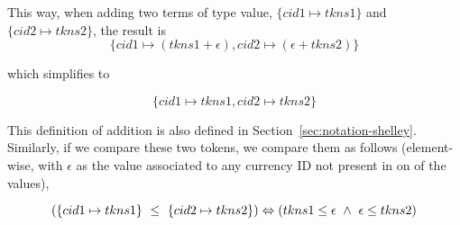This way, when adding two terms of type value, $\{ cid1 \mapsto tkns1\}$ and
$\{ cid2 \mapsto tkns2\}$, the result is
\[ \{ cid1 \mapsto (tkns1 + \epsilon), cid2 \mapsto (\epsilon + tkns2)\} \]

which simplifies to

\[ \{ cid1 \mapsto tkns1, cid2 \mapsto tkns2\} \]

This definition of addition is also defined in Section~\ref{sec:notation-shelley}.
Similarly, if we compare these two tokens, we compare them as follows
(element-wise, with $\epsilon$ as the value associated to any currency ID
not present in on of the values),

\[ (\{ cid1 \mapsto tkns1\}~\leq~\{ cid2 \mapsto tkns2\}) \Leftrightarrow \\
   (tkns1 \leq \epsilon~\wedge~ \epsilon \leq tkns2) \]

